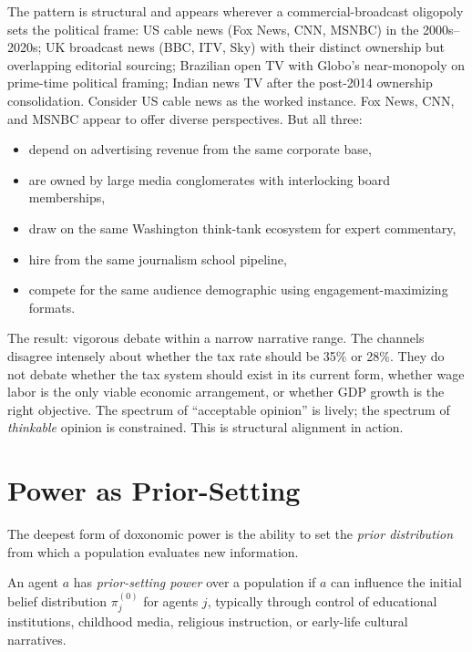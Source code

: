 \begin{example}
\label{ex:structural-alignment}
The pattern is structural and appears wherever a commercial-broadcast oligopoly sets the political frame: US cable news (Fox News, CNN, MSNBC) in the 2000s--2020s; UK broadcast news (BBC, ITV, Sky) with their distinct ownership but overlapping editorial sourcing; Brazilian open TV with Globo's near-monopoly on prime-time political framing; Indian news TV after the post-2014 ownership consolidation. Consider US cable news as the worked instance.
Fox News, CNN, and MSNBC appear to offer diverse perspectives.
But all three:
\begin{itemize}[nosep]
  \item depend on advertising revenue from the same corporate base,
  \item are owned by large media conglomerates with interlocking board memberships,
  \item draw on the same Washington think-tank ecosystem for expert commentary,
  \item hire from the same journalism school pipeline,
  \item compete for the same audience demographic using engagement-maximizing formats.
\end{itemize}
The result: vigorous debate within a narrow narrative range.
The channels disagree intensely about whether the tax rate should be 35\% or 28\%.
They do not debate whether the tax system should exist in its current form, whether wage labor is the only viable economic arrangement, or whether GDP growth is the right objective.
The spectrum of ``acceptable opinion'' is lively; the spectrum of \emph{thinkable} opinion is constrained.
This is structural alignment in action.
\end{example}


\section{Power as Prior-Setting}
\label{sec:ch9-priors}

The deepest form of doxonomic power is the ability to set the \emph{prior distribution} from which a population evaluates new information.

\begin{definition}
\label{def:prior-setting}
An agent $a$ has \emph{prior-setting power} over a population if $a$ can influence the initial belief distribution $\pi_j^{(0)}$ for agents $j$, typically through control of educational institutions, childhood media, religious instruction, or early-life cultural narratives.
\end{definition}

